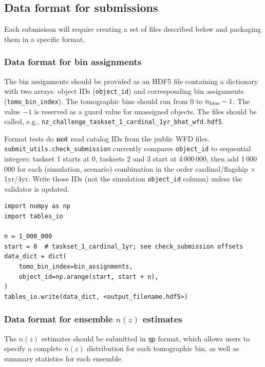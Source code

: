 \documentclass[11pt,twoside,letterpaper,onecolumn,english]{article}
\begin{document}
\subsection{Data format for submissions}

Each submisison will require creating a set of files described below and packaging them in a specific format.


\subsubsection{Data format for bin assignments}

The bin assignments should be provided as an HDF5 file containing a dictionary
with two arrays: object IDs (\texttt{object\_id}) and corresponding bin assignments (\texttt{tomo\_bin\_index}).  The tomographic
bins should run from 0 to $n_{\rm bins} -1$.  The value $-1$ is reserved as a guard
value for unassigned objects.  The files should be called, e.g., \texttt{nz\_challenge\_taskset\_1\_cardinal\_1yr\_bhat\_wfd.hdf5}.

Format tests do \textbf{not} read catalog IDs from the public WFD files.
\texttt{submit\_utils.check\_submission} currently compares \texttt{object\_id} to
sequential integers: taskset 1 starts at 0, tasksets 2 and 3 start at
4\,000\,000, then add 1\,000\,000 for each (simulation, scenario)
combination in the order cardinal/flagship $\times$ 1yr/4yr. Write those IDs
(not the simulation \texttt{object\_id} column) unless the validator is updated.

\begin{verbatim}
import numpy as np
import tables_io

n = 1_000_000
start = 0  # taskset_1_cardinal_1yr; see check_submission offsets
data_dict = dict(
    tomo_bin_index=bin_assignments,
    object_id=np.arange(start, start + n),
)
tables_io.write(data_dict, <output_filename.hdf5>)
\end{verbatim}



\subsubsection{\texorpdfstring{Data format for ensemble  $n(z)$ estimates}{Data format for ensemble n(z) estimates}}

The $n(z)$ estimates should be submitted in \texttt{qp} format,
which allows users to specify a complete $n(z)$ distribution for
each tomographic bin, as well as summary statistics for each ensemble.
\end{document}
